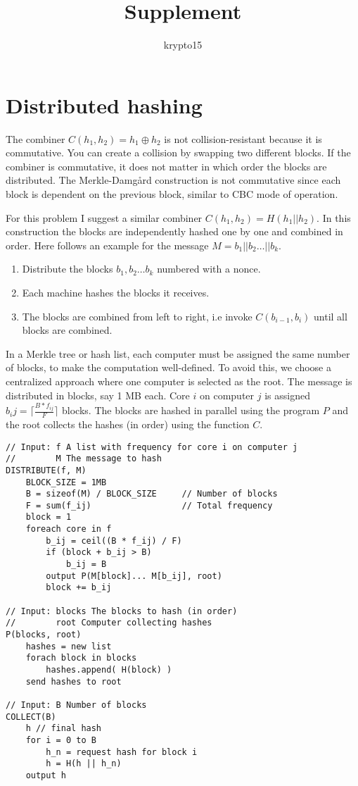 \documentclass{article}
\title{Supplement}
\author{}
\date{krypto15}
\begin{document}
\maketitle

\section{Distributed hashing}

The combiner $C(h_1, h_2) = h_1 \oplus h_2$ is not collision-resistant because it is commutative. You can create a collision by swapping two different blocks. If the combiner is commutative, it does not matter in which order the blocks are distributed. The Merkle-Damgård construction is not commutative since each block is dependent on the previous block, similar to CBC mode of operation. 

For this problem I suggest a similar combiner $C(h_1, h_2) = H(h_1 || h_2)$. In this construction the blocks are independently hashed one by one and combined in order. Here follows an example for the message $M=b_1 || b_2 \ldots || b_k$.
\begin{enumerate}
\item Distribute the blocks $b_1, b_2\ldots b_k$ numbered with a nonce.
\item Each machine hashes the blocks it receives.
\item The blocks are combined from left to right, i.e invoke $C(b_{i-1}, b_i)$ until all blocks are combined.
\end{enumerate}

In a Merkle tree or hash list, each computer must be assigned the same number of blocks, to make the computation well-defined. To avoid this, we choose a centralized approach where one computer is selected as the root. The message is distributed in blocks, say 1 MB each. Core $i$ on computer $j$ is assigned $b_ij = \lceil \frac{B*f_{ij}}{F} \rceil$ blocks. The blocks are hashed in parallel using the program $P$ and the root collects the hashes (in order) using the function $C$.

\begin{verbatim}
// Input: f A list with frequency for core i on computer j
//        M The message to hash
DISTRIBUTE(f, M)
    BLOCK_SIZE = 1MB
    B = sizeof(M) / BLOCK_SIZE     // Number of blocks
    F = sum(f_ij)                  // Total frequency
    block = 1
    foreach core in f
        b_ij = ceil((B * f_ij) / F)
        if (block + b_ij > B) 
            b_ij = B
        output P(M[block]... M[b_ij], root)
        block += b_ij
        
// Input: blocks The blocks to hash (in order)
//        root Computer collecting hashes
P(blocks, root)
    hashes = new list
    forach block in blocks
        hashes.append( H(block) )
    send hashes to root

// Input: B Number of blocks 
COLLECT(B)
    h // final hash
    for i = 0 to B
        h_n = request hash for block i
        h = H(h || h_n)
    output h
\end{verbatim}
\end{document}
